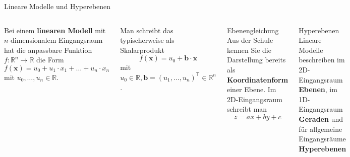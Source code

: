 \begin{frame}{Lineare Modelle und Hyperebenen}
\footnotesize
\begin{columns}

Bei einem \textbf{linearen Modell} mit $n$-dimensionalem Eingangsraum hat die anpassbare Funktion $f: \mathbb{R}^n \to \mathbb{R}$ die Form
\[
    f(\mathbf{x} ) = u_0 + u_1\cdot x_1 + \dots + u_n \cdot x_n
\]
mit $u_0, \dots , u_n \in \mathbb{R}$. \medskip

Man schreibt das typischerweise als Skalarprodukt
\[
    f(\mathbf{x} ) = u_0 + \mathbf{b} \cdot \mathbf{x}
\]
mit  $u_0\in \mathbb{R}, \mathbf{b} = (u_1, \dots, u_n)^{\mathsf{T}} \in \mathbb{R}^n$.


\begin{block}{\footnotesize Ebenengleichung}
Aus der Schule kennen Sie die Darstellung bereits als \textbf{Koordinatenform} einer Ebene. Im  2D-Eingangsraum schreibt man
\[
z=ax+by+c
\]
\end{block}

\begin{blockC3}{\footnotesize Hyperebenen}
Lineare Modelle beschreiben im 2D-Eingangsraum \textbf{Ebenen}, im 1D-Eingangsraum \textbf{Geraden} und für allgemeine Eingangsräume \textbf{Hyperebenen}
\end{blockC3}

\end{columns}



\end{frame}

